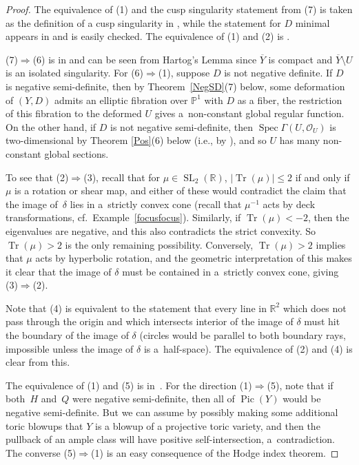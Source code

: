 \documentclass[10pt,a4paper]{amsart}
\numberwithin{equation}{section}
\numberwithin{figure}{section}
\numberwithin{table}{section}
\DeclareMathOperator{\Pic}{Pic}
\DeclareMathOperator{\Spec}{Spec}
\DeclareMathOperator{\Tr}{Tr}
\DeclareMathOperator{\SL}{SL}
\let\?=\overline
\let\bb=\mathbb
\let\s=\mathcal
\theoremstyle{definition}
\begin{document}
\begin{proof}The equivalence of (1) and the cusp singularity statement from (7) is taken as the definition of a cusp singularity in \cite{GHK1}, while the statement for $D$ minimal appears in \cite[Example~1.10]{GHK1} and is easily checked. The equivalence of (1) and (2) is \cite[Lemma~1.5, arXiv v1]{GHK1}.

(7)$\Rightarrow$(6) is in \cite{GHK2} and can be seen from Hartog's Lemma since $\?{Y}$ is compact and $\?{Y}\setminus U$ is an isolated singularity. For (6)$\Rightarrow$(1), suppose $D$ is not negative definite. If $D$ is negative semi-definite, then by Theorem~\ref{NegSD}(7) below, some deformation of $(Y,D)$ admits an elliptic fibration over $\bb{P}^1$ with $D$ as a fiber, the restriction of this fibration to the deformed $U$ gives a~non-constant global regular function. On the other hand, if $D$ is not negative semi-definite, then $\Spec \Gamma(U,\s{O}_U)$ is two-dimensional by Theorem \ref{Pos}(6) below (i.e., by \cite[Lemma~6.9]{GHK1}), and so $U$ has many non-constant global sections.

To see that (2)$\Rightarrow$(3), recall that for $\mu \in \SL_2(\bb{R})$, $|\Tr(\mu)|\leq 2$ if and only if $\mu$ is a rotation or shear map, and either of these would contradict the claim that the image of~$\delta$ lies in a~strictly convex cone (recall that $\mu^{-1}$ acts by deck transformations, cf.\ Example~\ref{focusfocus}). Similarly, if \mbox{$\Tr(\mu)<-2$}, then the eigenvalues are negative, and this also contradicts the strict convexity. So $\Tr(\mu)>2$ is the only remaining possibility. Conversely, $\Tr(\mu)>2$ implies that $\mu$ acts by hyperbolic rotation, and the geometric interpretation of this makes it clear that the image of $\delta$ must be contained in a~strictly convex cone, giving (3)$\Rightarrow$(2).

Note that (4) is equivalent to the statement that every line in $\bb{R}^2$ which does not pass through the origin and which intersects interior of the image of $\delta$ must hit the boundary of the image of $\delta$ (circles would be parallel to both boundary rays, impossible unless the image of $\delta$ is a~half-space). The equivalence of (2) and (4) is clear from this.

The equivalence of (1) and (5) is in~\cite{GHK2}. For the direction (1)$\Rightarrow$(5), note that if both~$H$ and~$Q$ were negative semi-definite, then all of $\Pic(Y)$ would be negative semi-definite. But we can assume by possibly making some additional toric blowups that $Y$ is a blowup of a projective toric variety, and then the pullback of an ample class will have positive self-intersection, a~contradiction. The converse (5)$\Rightarrow$(1) is an easy consequence of the Hodge index theorem.
\end{proof}
\end{document}
